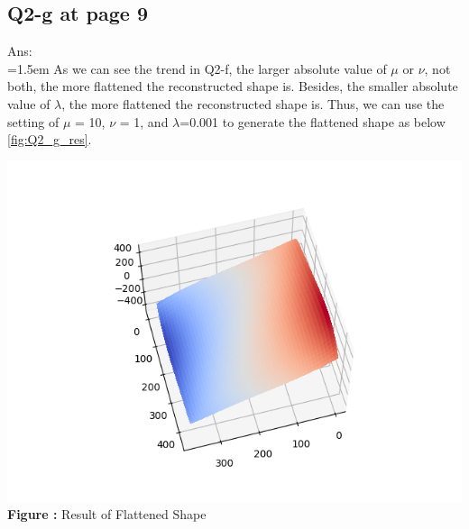 \documentclass{article}
\begin{document}
	\newpage
	\subsection*{Q2-g at page 9}
	Ans:\\
	\hangindent=1.5em \hspace{1.5em}As we can see the trend in Q2-f, the larger absolute value of $\mu$ or $\nu$, not both, the more flattened the reconstructed shape is. Besides, the smaller absolute value of $\lambda$, the more flattened the reconstructed shape is. Thus, we can use the setting of $\mu$ = 10, $\nu$ = 1, and $\lambda$=0.001 to generate the flattened shape as below \autoref{fig:Q2_g_res}. 

	\begin{minipage}{1\linewidth}
	\centering
	\includegraphics[width=0.8\columnwidth, height=0.6\linewidth]{./src/2g_flattest_result/faceCalibrated_mu_10_v_1_lambda_0.001.png}
	  \\%
	\textbf{Figure \thefigure:} Result of Flattened Shape %
	\label{fig:Q2_g_res}         %
	\end{minipage}
	\newline
	
\end{document}
